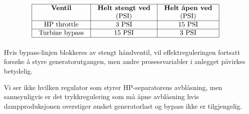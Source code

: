 
$$\vbox{\offinterlineskip
\halign{\strut
\vrule \quad\hfil # \ \hfil &
\vrule \quad\hfil # \ \hfil &
\vrule \quad\hfil # \ \hfil \vrule \cr
\noalign{\hrule}
%
{\bf Ventil} & {\bf Helt stengt ved} & {\bf Helt åpen ved} \cr
 & (PSI) & (PSI) \cr
%
\noalign{\hrule}
%
HP throttle & 3 PSI & 15 PSI \cr
%
\noalign{\hrule}
%
Turbine bypass & 15 PSI & 3 PSI \cr
%
\noalign{\hrule}
} %
}$$ %

Hvis bypass-linjen blokkeres av stengt håndventil, vil effektreguleringen fortsatt forsøke å styre generatorutgangen, men andre prosessvariabler i anlegget påvirkes betydelig.







Vi ser ikke hvilken regulator som styrer HP-separatorens avblåsning, men sannsynligvis er det trykkregulering som må åpne avblåsning hvis dampproduksjonen overstiger ønsket generatorlast og bypass ikke er tilgjengelig.


